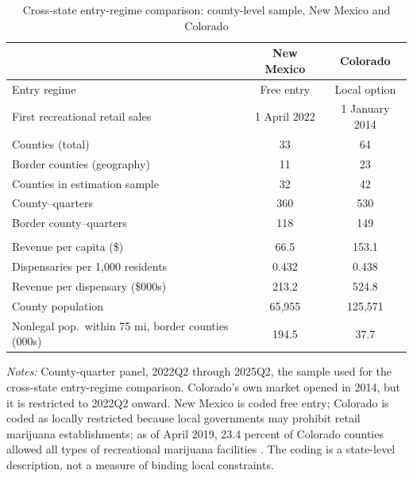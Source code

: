 \begin{table}[htbp]
\centering
\caption{Cross-state entry-regime comparison: county-level sample, New Mexico and Colorado}
\label{tab:sumstats_state}
\footnotesize
\begin{tabular}{lcc}
\toprule
 & New Mexico & Colorado \\
\midrule
Entry regime & Free entry & Local option \\
First recreational retail sales & 1 April 2022 & 1 January 2014 \\
\addlinespace
Counties (total) & 33 & 64 \\
\quad Border counties (geography) & 11 & 23 \\
\addlinespace
Counties in estimation sample & 32 & 42 \\
County--quarters & 360 & 530 \\
\quad Border county--quarters & 118 & 149 \\
\addlinespace
\multicolumn{3}{l}{\textit{County-quarter means}} \\
\quad Revenue per capita (\$) & 66.5 & 153.1 \\
\quad Dispensaries per 1,000 residents & 0.432 & 0.438 \\
\quad Revenue per dispensary (\$000s) & 213.2 & 524.8 \\
\quad County population & 65,955 & 125,571 \\
\quad Nonlegal pop.\ within 75 mi, border counties (000s) & 194.5 & 37.7 \\
\bottomrule
\end{tabular}
\begin{minipage}{0.86\textwidth}
\vspace{0.4em}\footnotesize
\textit{Notes:} County-quarter panel, 2022Q2 through 2025Q2, the sample used for the cross-state entry-regime comparison. Colorado's own market opened in 2014, but it is restricted to 2022Q2 onward. New Mexico is coded free entry; Colorado is coded as locally restricted because local governments may prohibit retail marijuana establishments; as of April 2019, 23.4 percent of Colorado counties allowed all types of recreational marijuana facilities \citep{PayanBrownSong2021}. The coding is a state-level description, not a measure of binding local constraints.
\end{minipage}
\end{table}
